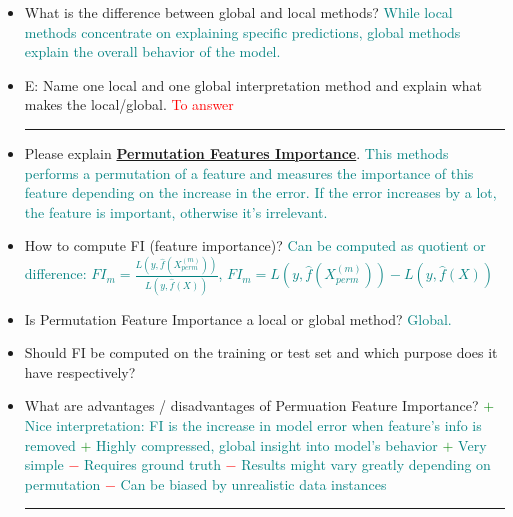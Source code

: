 \documentclass{report}
\newcommand{\asw}[2][teal]{}
\renewcommand{\asw}[2][teal]{\textcolor{#1}{#2}}
\newcommand{\qst}[2][red]{\textcolor{#1}{#2}}
\begin{document}
\begin{itemize}
{		\newline $\rightarrow$ SHAP: is a computation method for Shapley values, that also offers global interpretation
		methods based on combinations of Shapley values across the data.}
	\item What is the difference between global and local methods?
	\asw{\newline While local methods concentrate on explaining specific predictions, global methods explain the overall behavior of the model.}
	\item E: Name one local and one global interpretation method and explain what makes the local/global.
	\asw{\newline \qst{To answer}}
	\newline
	\hrule 
	
	\item Please explain \textbf{\underline{Permutation Features Importance}}.
	\asw{\newline This methods performs a permutation of a feature and measures the importance of this feature depending on the increase in the error. If the error increases by a lot, the feature is important, otherwise it's irrelevant.}
	\item How to compute FI (feature importance)?
	\asw{\newline Can be computed as quotient or difference: $FI_m = \frac{L(y, \hat{f}(X^{(m)}_{perm}))}{L(y, \hat{f}(X))}$, $FI_m = L(y, \hat{f}(X^{(m)}_{perm})) - L(y, \hat{f}(X))$}
	\item Is Permutation Feature Importance a  local or global method?
	\asw{\newline Global.}
	\item Should FI be computed on the training or test set and which purpose does it have respectively?
	\asw{\newline }
	\item What are advantages / disadvantages of Permuation Feature Importance?
	\asw{\newline \textcolor{green}{$+$} Nice interpretation: FI is the increase in model error when feature's info is removed
		\newline \textcolor{green}{$+$} Highly compressed, global insight into model's behavior
		\newline \textcolor{green}{$+$} Very simple
		\newline \textcolor{red}{$-$} Requires ground truth
		\newline \textcolor{red}{$-$} Results might vary greatly depending on permutation
		\newline \textcolor{red}{$-$} Can be biased by unrealistic data instances}
	\newline
	\hrule 
	

\end{itemize}
\end{document}
